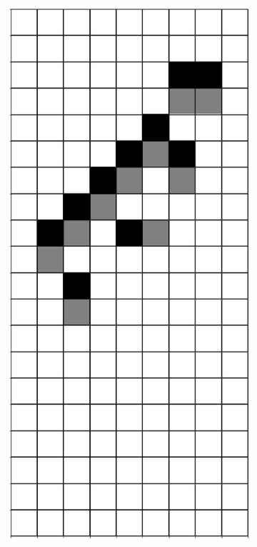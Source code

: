 \documentclass[12pt]{article}
\numberwithin{figure}{section} %
\begin{document}
\begin{figure}[H]
\begin{subfigure}{0.3\textwidth}
     \subcaption{}
   \end{subfigure}
     \begin{subfigure}{0.3\textwidth}
     \centering
     \includegraphics[angle=270,width=\linewidth]{Section4/22.7}

\end{subfigure}
\end{figure}
\end{document}
